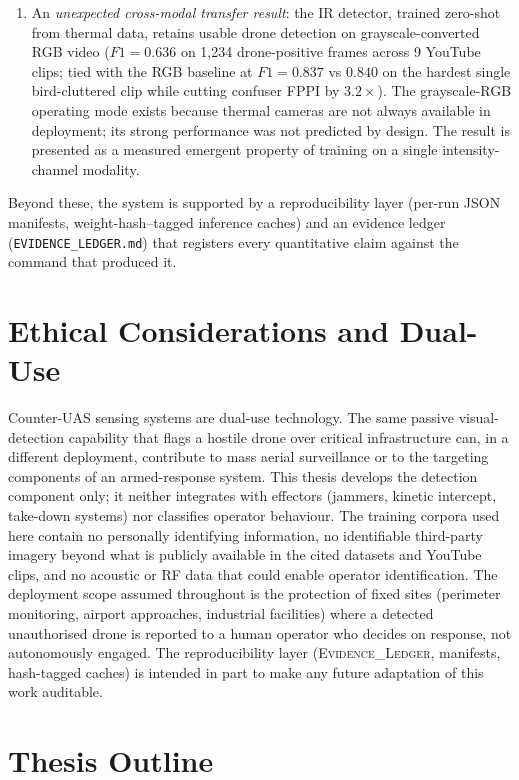 \documentclass[12pt,a4paper,oneside,openright]{book}
\begin{document}
\begin{enumerate}
    \item An \emph{unexpected cross-modal transfer result}: the IR detector, trained zero-shot from thermal data, retains usable drone detection on grayscale-converted RGB video ($F1=0.636$ on 1{,}234 drone-positive frames across 9 YouTube clips; tied with the RGB baseline at $F1=0.837$ vs $0.840$ on the hardest single bird-cluttered clip while cutting confuser FPPI by $3.2\times$). The grayscale-RGB operating mode exists because thermal cameras are not always available in deployment; its strong performance was not predicted by design. The result is presented as a measured emergent property of training on a single intensity-channel modality.
\end{enumerate}

Beyond these, the system is supported by a reproducibility layer (per-run JSON manifests, weight-hash--tagged inference caches) and an evidence ledger (\texttt{EVIDENCE\_LEDGER.md}) that registers every quantitative claim against the command that produced it.

\section{Ethical Considerations and Dual-Use}
\label{sec:ethics}

Counter-UAS sensing systems are dual-use technology. The same passive visual-detection capability that flags a hostile drone over critical infrastructure can, in a different deployment, contribute to mass aerial surveillance or to the targeting components of an armed-response system. This thesis develops the detection component only; it neither integrates with effectors (jammers, kinetic intercept, take-down systems) nor classifies operator behaviour. The training corpora used here contain no personally identifying information, no identifiable third-party imagery beyond what is publicly available in the cited datasets and YouTube clips, and no acoustic or RF data that could enable operator identification. The deployment scope assumed throughout is the protection of fixed sites (perimeter monitoring, airport approaches, industrial facilities) where a detected unauthorised drone is reported to a human operator who decides on response, not autonomously engaged. The reproducibility layer (\textsc{Evidence\_Ledger}, manifests, hash-tagged caches) is intended in part to make any future adaptation of this work auditable.

\section{Thesis Outline}
\label{sec:outline}
\end{document}
